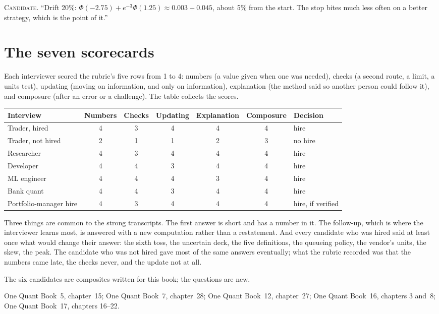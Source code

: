 \noindent\textsc{Candidate.} ``Drift 20\%: $\Phi(-2.75) + e^{-3}\Phi(1.25) \approx 0.003 + 0.045$, about 5\% from the start. The stop
bites much less often on a better strategy, which is the point of it.''


\section{The seven scorecards}

Each interviewer scored the rubric's five rows from 1 to 4: numbers (a value given when one was needed), checks (a second route, a
limit, a units test), updating (moving on information, and only on information), explanation (the method said so another person
could follow it), and composure (after an error or a challenge). The table collects the scores.

\begin{center}
\footnotesize
\setlength{\tabcolsep}{4pt}
\begin{tabular}{lcccccl}
\toprule
Interview & Numbers & Checks & Updating & Explanation & Composure & Decision \\
\midrule
Trader, hired & 4 & 3 & 4 & 4 & 4 & hire \\
Trader, not hired & 2 & 1 & 1 & 2 & 3 & no hire \\
Researcher & 4 & 3 & 4 & 4 & 4 & hire \\
Developer & 4 & 4 & 3 & 4 & 4 & hire \\
ML engineer & 4 & 4 & 4 & 3 & 4 & hire \\
Bank quant & 4 & 4 & 3 & 4 & 4 & hire \\
Portfolio-manager hire & 4 & 3 & 4 & 4 & 4 & hire, if verified \\
\bottomrule
\end{tabular}
\end{center}

Three things are common to the strong transcripts. The first answer is short and has a number in it. The follow-up, which is
where the interviewer learns most, is answered with a new computation rather than a restatement. And every candidate who was
hired said at least once what would change their answer: the sixth toss, the uncertain deck, the five definitions, the queueing
policy, the vendor's units, the skew, the peak. The candidate who was not hired gave most of the same answers eventually; what
the rubric recorded was that the numbers came late, the checks never, and the update not at all.

\begin{omsources}
\item The six candidates are composites written for this book; the questions are new.
\item One Quant Book~5, chapter~15; One Quant Book~7, chapter~28; One Quant Book~12, chapter~27; One Quant Book~16, chapters 3
and~8; One Quant Book~17, chapters 16--22.
\end{omsources}
